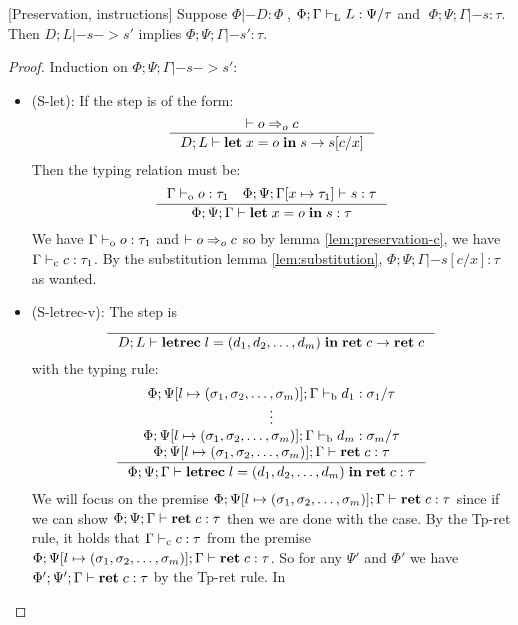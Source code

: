 \documentclass[a4paper, oneside, 10pt, final]{memoir}
\begin{document}
\begin{lem}{[Preservation, instructions]}
  \label{lem:preservation-i}
  Suppose $\Phi |- D : \Phi \;$, $\Phi;\Gamma |-_{\mathrm{L}} L : \Psi / \tau$ and
  $\; \Phi;\Psi;\Gamma |- s : \tau$. Then $D;L |- s -> s'$ implies
  $\Phi;\Psi;\Gamma |- s' : \tau$.
\end{lem}
\begin{proof}
  Induction on $\Phi;\Psi;\Gamma |- s -> s'$:
  \begin{itemize}
  \item (S-let): If the step is of the form:
    \begin{equation*}
      \inference{|- o \eop c}{D;L |- \ilet{x}{o}{s} -> s[c/x]}
    \end{equation*}
    Then the typing relation must be:
    \begin{equation*}
    \inference{\Gamma \tpop o : \tau_1 \quad \Phi ; \Psi ;
      \Gamma[x \mapsto \tau_1] |- s : \tau}{\Phi ; \Psi ; \Gamma |-
      \ilet{x}{o}{s} : \tau}
    \end{equation*}
    We have $\Gamma |-_{\mathrm{o}} o : \tau_1$ and $|- o =>_{o} c$ so by lemma
    \ref{lem:preservation-c}, we have $\Gamma |-_{\mathrm{c}} c : \tau_1$. By the
    substitution lemma \ref{lem:substitution}, $\Phi;\Psi;\Gamma |-
    s[c/x] : \tau$ as wanted.
  \item (S-letrec-v):
    The step is
    \begin{equation*}
      \inference{}{D;L |- \iletrec{l}{\dbundle}
        {\iret{c}} -> \iret{c}}
    \end{equation*}
    with the typing rule:
    \begin{equation*}
    \inference{\Phi;\Psi[l \mapsto \bbtypes];\Gamma \tpb d_1 :
      \sigma_1 / \tau\\
      \vdots\\
      \Phi;\Psi[l \mapsto \bbtypes];\Gamma \tpb d_m : \sigma_m / \tau\\
      \Phi;\Psi[l \mapsto \bbtypes];\Gamma |- \iret{c} : \tau}
       {\Phi;\Psi;\Gamma |- \iletrec{l}{\dbundle}{\iret{c}} : \tau}
    \end{equation*}
    We will focus on the premise $\Phi;\Psi[l \mapsto (\sigma_1, \sigma_2, \dotsc, \sigma_m)];\Gamma
    |- \mathbf{ret} \; c : \tau$  since if we can show $\Phi;\Psi;\Gamma |-
    \mathbf{ret} \; c : \tau$ then we are done with the case. By the Tp-ret
    rule, it holds that $\Gamma |-_{\mathrm{c}} c : \tau$ from the premise $\Phi;\Psi[l \mapsto (\sigma_1, \sigma_2, \dotsc, \sigma_m)];\Gamma
    |- \mathbf{ret} \; c : \tau$. So for any $\Psi'$ and $\Phi'$ we have
    $\Phi';\Psi';\Gamma |- \mathbf{ret} \; c : \tau$ by the Tp-ret rule. In

\end{itemize}
\end{proof}
\end{document}
